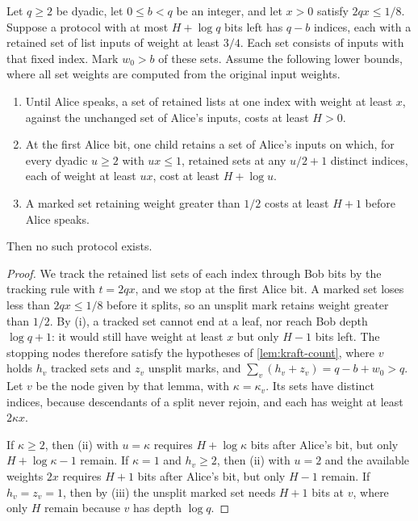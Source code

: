 \documentclass[11pt,letterpaper]{article} \usepackage[utf8]{inputenc}
\theoremstyle{plain} \newtheorem{theorem}{Theorem}[section]
\theoremstyle{definition} \newaliascnt{definition}{theorem}
\begin{document}
\begin{lemma}\label{lem:collision-tracking}
Let $q\ge2$ be dyadic, let $0\le b<q$ be an integer, and let $x>0$
satisfy $2qx\le1/8$.
Suppose a protocol with at most
$H+\log q$ bits left has $q-b$ indices, each with a retained set of
list inputs of weight at least $3/4$. Each set consists of inputs with that
fixed index. Mark $w_0>b$ of these sets.
Assume the following lower bounds, where all set weights are computed from
the original input weights.
\begin{enumerate}
\item[(i)] Until Alice speaks, a set of retained lists at one index with weight at least $x$, against the
unchanged set of Alice's inputs, costs at least $H>0$.
\item[(ii)] At the first Alice bit, one child retains a set of Alice's inputs on which,
for every dyadic $u\ge2$ with $ux\le1$, retained sets at any $u/2+1$ distinct indices, each
of weight at least $ux$, cost at least $H+\log u$.
\item[(iii)] A marked set retaining weight greater than $1/2$ costs at least
$H+1$ before Alice speaks.
\end{enumerate}
Then no such protocol exists.
\end{lemma}
\begin{proof}
We track the retained list sets of each index through Bob bits by the
tracking rule with $t=2qx$, and we stop at the first Alice bit. A marked set loses less
than $2qx\le1/8$ before it splits, so an unsplit mark retains weight greater
than $1/2$. By (i), a tracked set cannot end at a leaf, nor reach Bob depth
$\log q+1$: it would still have weight at least $x$ but only $H-1$ bits left.
The stopping nodes therefore satisfy the hypotheses of \cref{lem:kraft-count},
where $v$ holds $h_v$ tracked sets and $z_v$ unsplit marks, and
$\sum_v(h_v+z_v)=q-b+w_0>q$. Let $v$ be the node given by that lemma, with
$\kappa=\kappa_v$. Its sets have distinct indices, because descendants of a
split never rejoin, and each has weight at least $2\kappa x$.

If $\kappa\ge2$, then (ii) with $u=\kappa$ requires $H+\log\kappa$ bits after
Alice's bit, but only $H+\log\kappa-1$ remain. If $\kappa=1$ and $h_v\ge2$, then (ii) with $u=2$ and the
available weights $2x$ requires $H+1$ bits after Alice's bit, but only $H-1$
remain. If $h_v=z_v=1$, then by (iii) the unsplit marked set needs $H+1$ bits
at $v$, where only $H$ remain because $v$ has depth $\log q$.
\end{proof}
\end{document}
